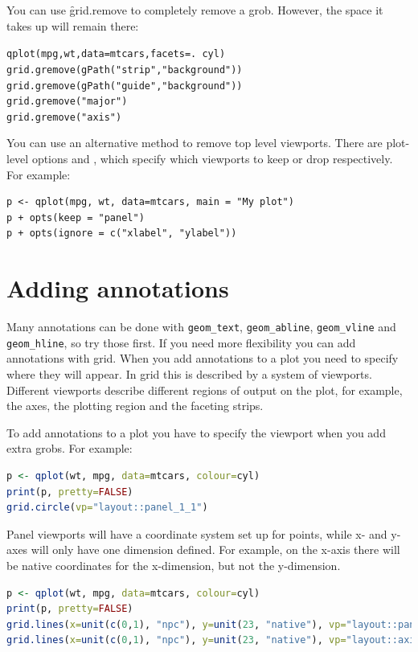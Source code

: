 You can use \f{grid.remove} to completely remove a grob.  However, the space it takes up will remain there:

\begin{alltt}
qplot(mpg, wt, data=mtcars, facets = . ~ cyl)
grid.gremove(gPath("strip", "background"))
grid.gremove(gPath("guide", "background"))
grid.gremove("major")
grid.gremove("axis")
\end{alltt}

You can use an alternative method to remove top level viewports.  There are plot-level options  and , which specify which viewports to keep or drop respectively.  For example:

\begin{lstlisting}
p <- qplot(mpg, wt, data=mtcars, main = "My plot")
p + opts(keep = "panel")
p + opts(ignore = c("xlabel", "ylabel"))
\end{lstlisting}

\section{Adding annotations}\label{sec:adding_annotation}
\label{sec:grid-new}

Many annotations can be done with {\tt geom\_text}, {\tt geom\_abline}, {\tt geom\_vline} and {\tt geom\_hline}, so try those first.  If you need more flexibility you can add annotations with grid.  When you add annotations to a plot you need to specify where they will appear.  In grid this is described by a system of viewports.  Different viewports describe different regions of output on the plot, for example, the axes, the plotting region and the faceting strips.

To add annotations to a plot you have to specify the viewport when you add extra grobs.  For example:

\begin{lstlisting}[language = R]
p <- qplot(wt, mpg, data=mtcars, colour=cyl)
print(p, pretty=FALSE)
grid.circle(vp="layout::panel_1_1")
\end{lstlisting}

Panel viewports will have a coordinate system set up for points, while x- and y- axes will only have one dimension defined.  For example, on the x-axis there will be native coordinates for the x-dimension, but not the y-dimension.

\begin{lstlisting}[language = R]
p <- qplot(wt, mpg, data=mtcars, colour=cyl)
print(p, pretty=FALSE)
grid.lines(x=unit(c(0,1), "npc"), y=unit(23, "native"), vp="layout::panel_1_1")
grid.lines(x=unit(c(0,1), "npc"), y=unit(23, "native"), vp="layout::axis_v_1_1")
\end{lstlisting}

